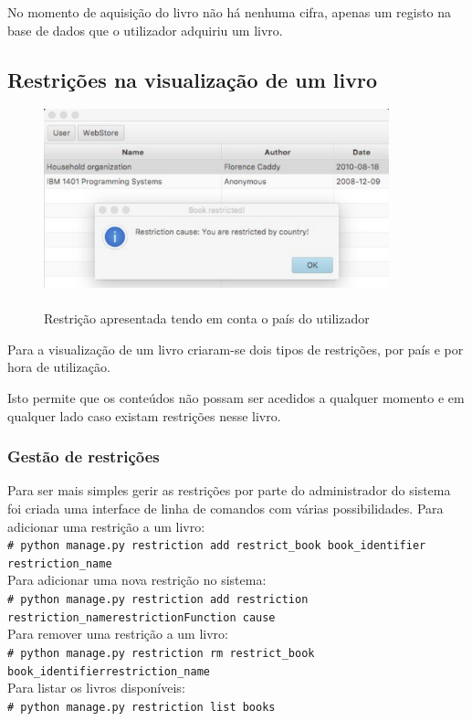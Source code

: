\documentclass[pdftex,12pt,a4paper]{report}
\newcommand{\shellcmd}[1]{\\\indent\indent\texttt{\footnotesize\# #1}\\}
\begin{document}
No momento de aquisição do livro não há nenhuma cifra, apenas um registo na base de dados que o utilizador adquiriu um livro.

\subsection{Restrições na visualização de um livro}

\begin{figure}[!htb]
\center
 \includegraphics[width=100mm,scale=1]{country_restriction.pdf}
 \caption{\\Restrição apresentada tendo em conta o país do utilizador}
 \label{fig:eer}
\end{figure}

Para a visualização de um livro criaram-se dois tipos de restrições, por país e por hora de utilização.

Isto permite que os conteúdos não possam ser acedidos a qualquer momento e em qualquer lado caso existam restrições nesse livro.

\subsubsection{Gestão de restrições}

Para ser mais simples gerir as restrições por parte do administrador do sistema foi criada uma interface de linha de comandos com várias possibilidades. 
Para adicionar uma restrição a um livro:
\shellcmd{python manage.py restriction add restrict{\_}book book{\_}identifier \linebreak restriction{\_}name}
\linebreak
Para adicionar uma nova restrição no sistema:
\shellcmd{python manage.py restriction add restriction restriction{\_}name\linebreak restrictionFunction cause}
Para remover uma restrição a um livro:
\shellcmd{python manage.py restriction rm restrict{\_}book book{\_}identifier\linebreak restriction{\_}name}
Para listar os livros disponíveis:
\shellcmd{python manage.py restriction list books}
\end{document}
